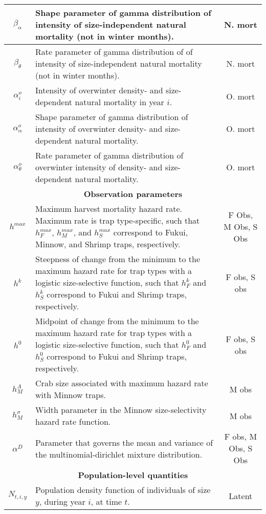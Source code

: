 \documentclass{article}
\begin{document}
\begin{longtable}{||c p{9cm} c||}
 \hline
 $\beta_{\alpha}$ & Shape parameter of gamma distribution of intensity of size-independent natural mortality (not in winter months). & N. mort \\ 
 \hline
 $\beta_{\theta}$ & Rate parameter of gamma distribution of of intensity of size-independent natural mortality (not in winter months). & N. mort \\ 
 \hline
 $\alpha^o_i$ & Intensity of overwinter density- and size-dependent natural mortality in year $i$. & O. mort \\ 
 \hline
 $\alpha^o_{\alpha}$ & Shape parameter of gamma distribution of intensity of overwinter density- and size-dependent natural mortality. & O. mort \\ 
 \hline
 $\alpha^o_{\theta}$ & Rate parameter of gamma distribution of overwinter intensity of density- and size-dependent natural mortality. & O. mort \\ 
 \hline\hline
 \multicolumn{3}{||c||}{\textbf{Observation parameters}} \\ 
 \hline
 $h^{max}$ & Maximum harvest mortality hazard rate. Maximum rate is trap type-specific, such that $h_F^{max}$, $h_M^{max}$, and $h_S^{max}$ correspond to Fukui, Minnow, and Shrimp traps, respectively. & F Obs, M Obs, S Obs \\ 
 \hline
 $h^{k}$ & Steepness of change from the minimum to the maximum hazard rate for trap types with a logistic size-selective function, such that $h_F^{k}$ and $h_S^{k}$ correspond to Fukui and Shrimp traps, respectively. & F obs, S obs \\ 
 \hline
 $h^{0}$ & Midpoint of change from the minimum to the maximum hazard rate for trap types with a logistic size-selective function, such that $h_F^{0}$ and $h_S^{0}$ correspond to Fukui and Shrimp traps, respectively. & F obs, S obs \\ 
 \hline
 $h_M^{A}$ & Crab size associated with maximum hazard rate with Minnow traps. & M obs \\ 
 \hline
 $h_M^{\sigma}$ & Width parameter in the Minnow size-selectivity hazard rate function. & M obs \\ 
 \hline
 $\alpha^D$ & Parameter that governs the mean and variance of the multinomial-dirichlet mixture distribution. & F obs, M Obs, S Obs \\
 \hline\hline
 \multicolumn{3}{||c||}{\textbf{Population-level quantities}} \\ 
 \hline
 $N_{t,i,y}$ & Population density function of individuals of size $y$, during year $i$, at time $t$. & Latent \\ 

\end{longtable}
\end{document}
